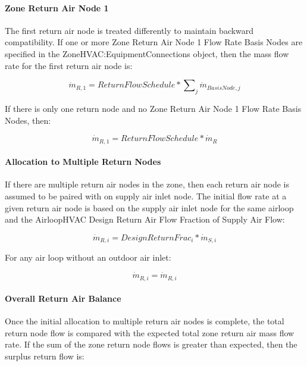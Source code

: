 \paragraph{Zone Return Air Node 1}\label{zone-return-air-node1}

The first return air node is treated differently to maintain backward compatibility. If one or more Zone Return Air Node 1 Flow Rate Basis Nodes are specified in the ZoneHVAC:EquipmentConnections object, then the mass flow rate for the first return air node is:

\begin{equation}
{\dot m_{R,1}} = ReturnFlowSchedule*\sum\nolimits_j {{{\dot m}_{BasisNode,j}}}
\end{equation}

If there is only one return node and no Zone Return Air Node 1 Flow Rate Basis Nodes, then:

\begin{equation}
{\dot m_{R,1}} = ReturnFlowSchedule*{\dot m_{R}}
\end{equation}

\paragraph{Allocation to Multiple Return Nodes}\label{allocation-to-multiple-return-nodes}

If there are multiple return air nodes in the zone, then each return air node is assumed to be paired with on supply air inlet node. The initial flow rate at a given return air node is based on the supply air inlet node for the same airloop and the AirloopHVAC Design Return Air Flow Fraction of Supply Air Flow:

\begin{equation}
{\dot m_{R,i}} = {DesignReturnFrac_i} * {\dot m_{S,i}}
\end{equation}

For any air loop without an outdoor air inlet:

\begin{equation}
{\dot m_{R,i}} = {\dot m_{R,i}}
\end{equation}

\paragraph{Overall Return Air Balance}\label{overall-return-air-balance}

Once the initial allocation to multiple return air nodes is complete, the total return node flow is compared with the expected total zone return air mass flow rate. If the sum of the zone return node flows is greater than expected, then the surplus return flow is:

